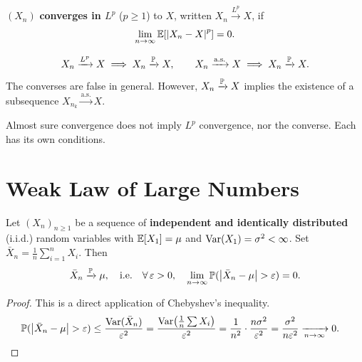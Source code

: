 \begin{definition}[Convergence in $L^p$]
$(X_n)$ \textbf{converges in $L^p$} ($p \geq 1$) to $X$, written
$X_n \xrightarrow{L^p} X$, if
\[
    \lim_{n \to \infty} \mathbb{E}[\left| X_n - X \right|^p] = 0.
\]
\end{definition}

\begin{theorem}
\[
    X_n \xrightarrow{L^p} X \implies X_n \xrightarrow{\mathbb{P}} X,
    \qquad
    X_n \xrightarrow{\text{a.s.}} X \implies X_n \xrightarrow{\mathbb{P}} X.
\]
The converses are false in general. However,
$X_n \xrightarrow{\mathbb{P}} X$ implies the existence of a subsequence
$X_{n_k} \xrightarrow{\text{a.s.}} X$.
\end{theorem}

\begin{warning}[title=\textbf{a.s.\ convergence and $L^p$ convergence}]
Almost sure convergence does not imply $L^p$ convergence, nor the converse.
Each has its own conditions.
\end{warning}

\section{Weak Law of Large Numbers}

\begin{theorem}
\label{thm:wlln}
Let $(X_n)_{n \geq 1}$ be a sequence of \textbf{independent and identically
distributed} (i.i.d.) random variables with $\mathbb{E}[X_1] = \mu$ and
$\mathrm{Var}(X_1) = \sigma^2 < \infty$. Set
$\bar{X}_n = \frac{1}{n}\sum_{i=1}^n X_i$. Then
\[
    \bar{X}_n \xrightarrow{\mathbb{P}} \mu, \quad \text{i.e.} \quad
    \forall\,\varepsilon > 0,\quad
    \lim_{n \to \infty} \mathbb{P}(\left| \bar{X}_n - \mu \right| > \varepsilon) = 0.
\]
\end{theorem}

\begin{proof}
This is a direct application of Chebyshev's inequality.
\begin{align*}
    \mathbb{P}(\left| \bar{X}_n - \mu \right| > \varepsilon)
    &\leq \frac{\mathrm{Var}(\bar{X}_n)}{\varepsilon^2}
    = \frac{\mathrm{Var}\!\left(\frac{1}{n}\sum X_i\right)}{\varepsilon^2}
    = \frac{1}{n^2}\cdot\frac{n\sigma^2}{\varepsilon^2}
    = \frac{\sigma^2}{n\varepsilon^2}
    \xrightarrow[n\to\infty]{} 0. \qedhere
\end{align*}
\end{proof}

